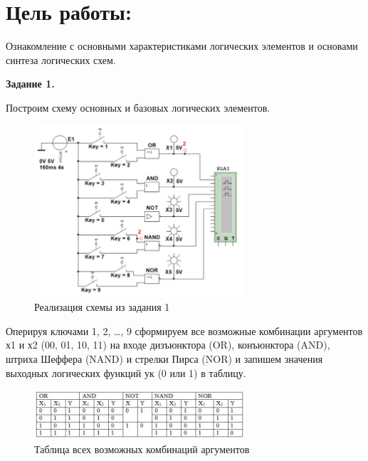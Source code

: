 \documentclass[spec, och, labwork]{shiza}
\begin{document}
\section{Цель работы:}

Ознакомление с основными характеристиками логических элементов и основами синтеза логических схем.

\textbf{Задание 1.}

Построим схему основных и базовых логических элементов.

    \begin{figure}[H]
        \centering      %
        \includegraphics[width=0.7\textwidth]{1}
        \caption{Реализация схемы из задания 1}
        \label{fig:image1}
    \end{figure}
        
    Оперируя ключами 1, 2, …, 9 сформируем все возможные комбинации аргументов х1 и х2 (00, 01, 10, 11) на входе 
    дизъюнктора (OR), конъюнктора (AND), штриха Шеффера (NAND) и стрелки Пирса (NOR) и запишем значения выходных 
    логических функций ук (0 или 1) в таблицу.

    \begin{figure}[H]
        \centering      %
        \includegraphics[width=0.7\textwidth]{2}
        \caption{Таблица всех возможных комбинаций аргументов}
        \label{fig:image1}
    \end{figure}
        
\end{document}
